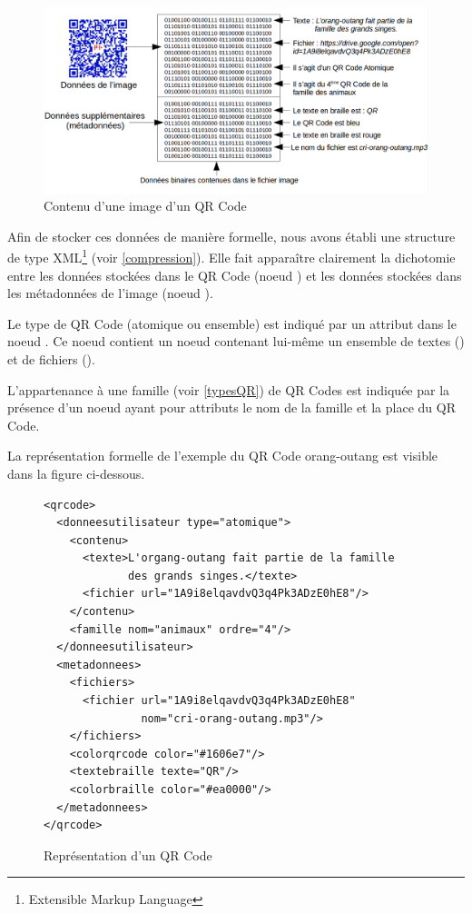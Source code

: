 \begin{figure}[!h]
	\centering
   \includegraphics[scale=0.33]{img/schema_representation_donnees.png}
   \caption{Contenu d'une image d'un QR Code}
\end{figure}

\newpage
\par
Afin de stocker ces données de manière formelle, nous avons établi une structure de type XML\footnote{Extensible Markup Language} (voir \ref{compression}). Elle fait apparaître clairement la dichotomie entre les données stockées dans le QR Code (noeud ) et les données stockées dans les métadonnées de l'image (noeud ).
\par
Le type de QR Code (atomique ou ensemble) est indiqué par un attribut dans le noeud . Ce noeud contient un noeud  contenant lui-même un ensemble de textes () et de fichiers ().
\par
L'appartenance à une famille (voir \ref{typesQR}) de QR Codes est indiquée par la présence d'un noeud  ayant pour attributs le nom de la famille et la place du QR Code.
\par
La représentation formelle de l'exemple du QR Code orang-outang est visible dans la figure ci-dessous.

\begin{figure}[!h]
\begin{adjustbox}{minipage=\textwidth,bgcolor={RGB}{240 240 240}}

\lstset{language=XML}

\begin{lstlisting}
<qrcode>
  <donneesutilisateur type="atomique">
    <contenu>
      <texte>L'organg-outang fait partie de la famille 
             des grands singes.</texte>
      <fichier url="1A9i8elqavdvQ3q4Pk3ADzE0hE8"/>
    </contenu>
    <famille nom="animaux" ordre="4"/>
  </donneesutilisateur>
  <metadonnees>
    <fichiers>
      <fichier url="1A9i8elqavdvQ3q4Pk3ADzE0hE8" 
               nom="cri-orang-outang.mp3"/>
    </fichiers>
    <colorqrcode color="#1606e7"/>
    <textebraille texte="QR"/>
    <colorbraille color="#ea0000"/>
  </metadonnees>
</qrcode>
\end{lstlisting}

\end{adjustbox}
\caption{Représentation d'un QR Code}

\end{figure}\textbf{}